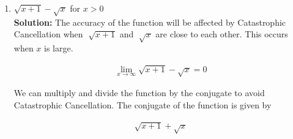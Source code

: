 \documentclass[11pt,onecolumn]{article}
\begin{document}
\begin{enumerate}[label=(\alph*)]
\begin{subequations}
              Hence, the accuracy of the function is poor when $x$ is close to $0.$ To devise an accurate expression for the function,

              \begin{align*}
                  \csc (x) - \cot (x) = \frac{1}{\sin(x)} - \frac{\cos(x)}{\sin(x)} = \frac{1 - \cos(x)}{\sin(x)}
              \end{align*}

              We will use the double angle identity to express the function in terms of $\sin(x/2)$ and $\cos(x/2).$ The double angle identity is given by

              \begin{enumerate}
                  \item $\cos(x) = 1 - 2\sin^2(x/2)$
                  \item $\sin(x) = 2\sin(x/2)\cos(x/2)$
              \end{enumerate}

              The function can be expressed as

              \begin{align*}
                  \csc (x) - \cot (x) = \frac{1 - (1 - 2\sin^2(x/2))}{2\sin(x/2)\cos(x/2)} = \frac{2\sin^2(x/2)}{2\sin(x/2)\cos(x/2)} = \frac{\sin(x/2)}{\cos(x/2)} = \tan(\frac{x}{2})
              \end{align*}

          \end{subequations}

          Hence, for $\mathbf{x = 10^{-10}},$ the value of the function is $\mathbf{\tan(\frac{10^{-10}}{2}) = 5 \times 10^{-11}}.$

    \item $\sqrt{x+1}-\sqrt{x}$ for $x>0$ \\
          \textbf{Solution:} The accuracy of the function will be affected by Catastrophic Cancellation when $\sqrt[]{x+1}$ and $\sqrt[]{x}$ are close to each other. This occurs when $x$ is large.

          \begin{align*}
              \lim_{x \to \infty} \sqrt{x+1}-\sqrt{x} = 0
          \end{align*}

          We can multiply and divide the function by the conjugate to avoid Catastrophic Cancellation. The conjugate of the function is given by

          \begin{align*}
              \sqrt{x+1}+\sqrt{x}
          \end{align*}


\end{enumerate}
\end{document}
